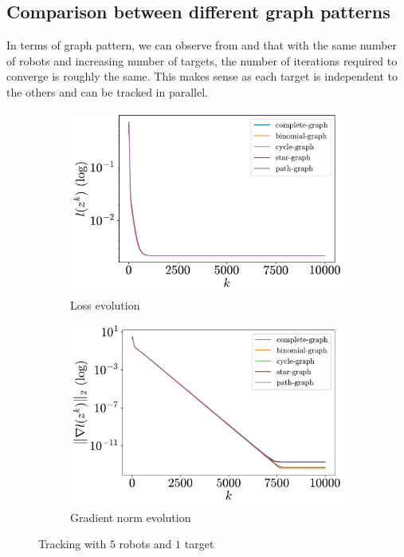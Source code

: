 \documentclass[a4paper,11pt,oneside]{book}
\begin{document}
\subsection{Comparison between different graph patterns}

In terms of graph pattern, we can observe from  and  that with the same number of robots and increasing number of targets, the number of iterations required to converge is roughly the same. This makes sense as each target is independent to the others and can be tracked in parallel.

\begin{figure}[tb!]
      \centering
      \begin{subfigure}[t]{0.46\linewidth}
            \centering
            \includegraphics[width=\linewidth]{./figs/tracking/5_1_2/loss.pdf} 
            \caption{Loss evolution}
      \end{subfigure}
      \hfill
      \begin{subfigure}[t]{0.46\linewidth}
            \centering
            \includegraphics[width=\linewidth]{./figs/tracking/5_1_2/gradient.pdf} 
            \caption{Gradient norm evolution}
      \end{subfigure}
      \caption{Tracking with $5$ robots and $1$ target}
      \label{fig:tracking_5_1}
\end{figure}
\end{document}

